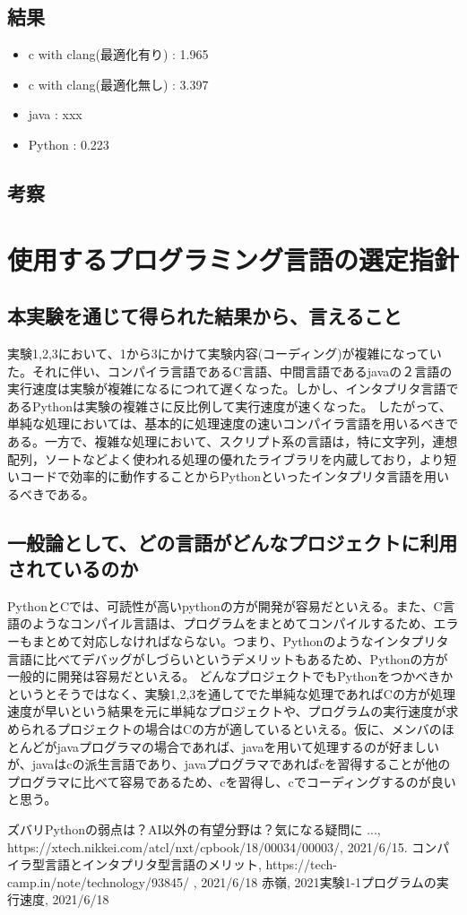 \documentclass[a4paper, 11pt, titlepage]{jsarticle}
\begin{document}
\subsection{結果}

\begin{itemize}
\item c with clang(最適化有り) : 1.965 
\item c with clang(最適化無し) : 3.397
\item java : xxx
\item Python : 0.223
\end{itemize}

\subsection{考察}
\section{使用するプログラミング言語の選定指針}
\subsection{本実験を通じて得られた結果から、言えること}
実験1,2,3において、1から3にかけて実験内容(コーディング)が複雑になっていた。それに伴い、コンパイラ言語であるC言語、中間言語であるjavaの２言語の実行速度は実験が複雑になるにつれて遅くなった。しかし、インタプリタ言語であるPythonは実験の複雑さに反比例して実行速度が速くなった。
したがって、単純な処理においては、基本的に処理速度の速いコンパイラ言語を用いるべきである。一方で、複雑な処理において、スクリプト系の言語は，特に文字列，連想配列，ソートなどよく使われる処理の優れたライブラリを内蔵しており，より短いコードで効率的に動作することからPythonといったインタプリタ言語を用いるべきである。

\subsection{一般論として、どの言語がどんなプロジェクトに利用されているのか}
PythonとCでは、可読性が高いpythonの方が開発が容易だといえる。また、C言語のようなコンパイル言語は、プログラムをまとめてコンパイルするため、エラーもまとめて対応しなければならない。つまり、Pythonのようなインタプリタ言語に比べてデバッグがしづらいというデメリットもあるため、Pythonの方が一般的に開発は容易だといえる。
どんなプロジェクトでもPythonをつかべきかというとそうではなく、実験1,2,3を通してでた単純な処理であればCの方が処理速度が早いという結果を元に単純なプロジェクトや、プログラムの実行速度が求められるプロジェクトの場合はCの方が適しているといえる。仮に、メンバのほとんどがjavaプログラマの場合であれば、javaを用いて処理するのが好ましいが、javaはcの派生言語であり、javaプログラマであればcを習得することが他のプログラマに比べて容易であるため、cを習得し、cでコーディングするのが良いと思う。
\begin{thebibliography}{99}
 ズバリPythonの弱点は？AI以外の有望分野は？気になる疑問に ..., https://xtech.nikkei.com/atcl/nxt/cpbook/18/00034/00003/, 2021/6/15.
  コンパイラ型言語とインタプリタ型言語のメリット, https://tech-camp.in/note/technology/93845/ , 2021/6/18
 赤嶺, 2021実験1-1プログラムの実行速度, 2021/6/18
\end{thebibliography}
\end{document}
